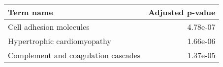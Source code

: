 \begin{tabular}{lr}
\toprule
                          Term name &  Adjusted p-value \\
\midrule
            Cell adhesion molecules &          4.78e-07 \\
        Hypertrophic cardiomyopathy &          1.66e-06 \\
Complement and coagulation cascades &          1.37e-05 \\
\bottomrule
\end{tabular}
